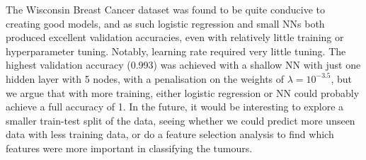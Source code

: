 The Wisconsin Breast Cancer dataset was found to be quite conducive to creating good models, and as such logistic regression and small NNs both produced excellent validation accuracies, even with relatively little training or hyperparameter tuning. Notably, learning rate required very little tuning. The highest validation accuracy (0.993) was achieved with a shallow NN with just one hidden layer with 5 nodes, with a penalisation on the weights of $\lambda=10^{-3.5}$, but we argue that with more training, either logistic regression or NN could probably achieve a full accuracy of 1. In the future, it would be interesting to explore a smaller train-test split of the data, seeing whether we could predict more unseen data with less training data, or do a feature selection analysis to find which features were more important in classifying the tumours.